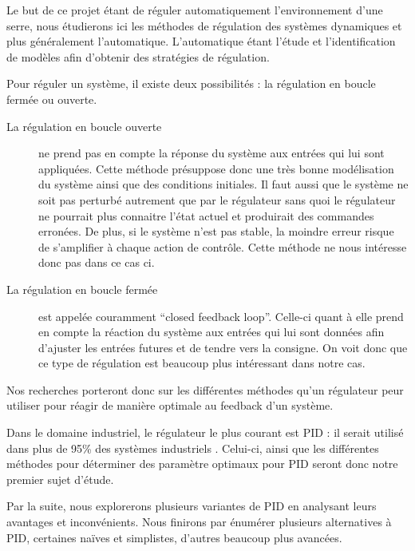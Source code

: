 
Le but de ce projet étant de réguler automatiquement l'environnement d'une serre,
nous étudierons ici les méthodes de régulation des systèmes dynamiques et plus généralement l'automatique.
L'automatique étant l'étude et l'identification de modèles afin d'obtenir des stratégies de régulation.

Pour réguler un système, il existe deux possibilités : la régulation en boucle fermée ou ouverte.

\begin{description}
\item[La régulation en boucle ouverte] ne prend pas en compte la réponse du système aux entrées qui lui sont appliquées. Cette méthode présuppose donc une très bonne modélisation du système ainsi que des conditions initiales.
Il faut aussi que le système ne soit pas perturbé autrement que par le régulateur sans quoi le régulateur ne pourrait plus connaitre l'état actuel et produirait des commandes erronées.
De plus, si le système n'est pas stable, la moindre erreur risque de s'amplifier à chaque action de contrôle.
Cette méthode ne nous intéresse donc pas dans ce cas ci.

\item[La régulation en boucle fermée] est appelée couramment ``closed feedback loop''.
Celle-ci quant à elle prend en compte la réaction du système aux entrées qui lui sont données afin d'ajuster les entrées futures et de tendre vers la consigne.
On voit donc que ce type de régulation est beaucoup plus intéressant dans notre cas.
\end{description}

Nos recherches porteront donc sur les différentes méthodes qu'un régulateur peur utiliser pour réagir de manière optimale au feedback d'un système.


Dans le domaine industriel, le régulateur le plus courant est PID : il serait utilisé dans plus de 95\% des systèmes industriels \cite{Kinnaert2013}.
Celui-ci, ainsi que les différentes méthodes pour déterminer des paramètre optimaux pour PID seront donc notre premier sujet d'étude.

Par la suite, nous explorerons plusieurs variantes de PID en analysant leurs avantages et inconvénients.
Nous finirons par énumérer plusieurs alternatives à PID, certaines naïves et simplistes, d'autres beaucoup plus avancées.
